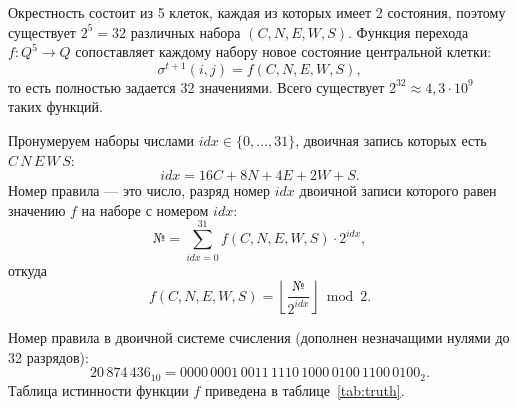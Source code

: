 \documentclass[a4paper,14pt]{extarticle}
\begin{document}
Окрестность состоит из 5 клеток, каждая из которых имеет 2 состояния, поэтому существует $2^5 = 32$ различных набора $(C, N, E, W, S)$. Функция перехода $f: Q^5 \to Q$ сопоставляет каждому набору новое состояние центральной клетки:
\[
	\sigma^{t+1}(i, j) = f(C, N, E, W, S),
\]
то есть полностью задается 32 значениями. Всего существует $2^{32} \approx 4{,}3 \cdot 10^9$ таких функций.

Пронумеруем наборы числами $idx \in \{0, \dots, 31\}$, двоичная запись которых есть $C\,N\,E\,W\,S$:
\[
	idx = 16C + 8N + 4E + 2W + S.
\]
Номер правила --- это число, разряд номер $idx$ двоичной записи которого равен значению $f$ на наборе с номером $idx$:
\[
	\text{№} = \sum_{idx=0}^{31} f(C, N, E, W, S) \cdot 2^{idx},
\]
откуда
\[
	f(C, N, E, W, S) = \left\lfloor \frac{\text{№}}{2^{idx}} \right\rfloor \bmod 2.
\]

Номер правила в двоичной системе счисления (дополнен незначащими нулями до 32 разрядов):
\[
	20\,874\,436_{10} = 0000\,0001\,0011\,1110\,1000\,0100\,1100\,0100_2.
\]
Таблица истинности функции $f$ приведена в таблице~\ref{tab:truth}.
\end{document}
